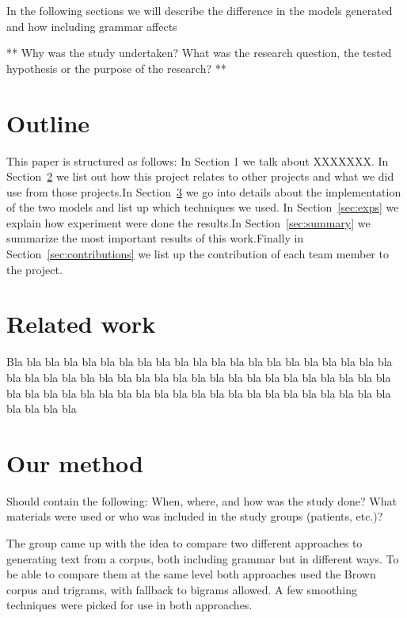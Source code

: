 \documentclass[a4paper,12pt]{article}
\begin{document}
In the following sections we will describe the difference in the models generated and how including grammar affects
 

**
Why was the study undertaken? What was the research question, the tested hypothesis or the purpose of the research?
**


\section{Outline}
This paper is structured as follows: In Section 1 we talk about XXXXXXX. In Section~\ref{sec:relwork} we list out how this project relates to other projects and what we did use from those projects.In Section~\ref{sec:method} we go into details about the implementation of the two models and list up which techniques we used. In Section~\ref{sec:exps} we explain how experiment were done the results.In Section~\ref{sec:summary} we summarize the most important results of this work.Finally in Section~\ref{sec:contributions} we list up the contribution of each team member to the project.

\section{Related work}
\label{sec:relwork}

Bla bla bla bla bla bla bla bla bla bla bla bla bla bla bla bla bla 
bla bla bla bla bla bla bla bla bla bla bla bla bla bla bla bla bla 
bla bla bla bla bla bla bla bla bla bla bla bla bla bla bla bla bla 
bla bla bla bla bla bla bla bla bla bla \cite{RussellNorvigAIBook3rd}
bla bla bla bla bla bla

\section{Our method}
\label{sec:method}

Should contain the following: When, where, and how was the study done? What materials were used or who was included in the study groups (patients, etc.)?


The group came up with the idea to compare two different approaches to generating text from a corpus, both including grammar but in different ways. To be able to compare them at the same level both approaches used the Brown corpus and trigrams, with fallback to bigrams allowed. A few smoothing techniques were picked for use in both approaches.
\end{document}
